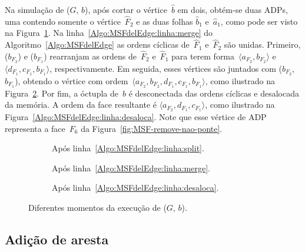 Na simulação de \MSFdelEdge($G$, $b$), após cortar o vértice~$\hat b$ em dois, obtém-se duas ADPs, uma contendo somente o vértice~$\hat F_2$ e as duas folhas $\hat b_1$ e~$\hat a_1$, como pode ser visto na Figura~\ref{fig:MSF-remove-aresta-ex-1}.
Na linha~\ref{Algo:MSFdelEdge:linha:merge} do Algoritmo~\ref{Algo:MSFdelEdge} as ordens cíclicas de~$\hat F_1$ e~$\hat F_2$ são unidas.
Primeiro, \LCOCycle($b_{F_2}$) e \LCOCycle($b_{F_1}$) rearranjam as ordens de~$\hat F_2$ e~$\hat F_1$ para terem forma~$\langle  a_{F_2}, b_{F_2} \rangle$ e~$\langle d_{F_1}, c_{F_1}, b_{F_1}\rangle$, respectivamente.
Em seguida, esses vértices são juntados com \LCOMerge($b_{F_2}$, $b_{F_1}$), obtendo o vértice com ordem~$\langle a_{F_2}, b_{F_2}, d_{F_1}, c_{F_1}, b_{F_1}\rangle$, como ilustrado na Figura~\ref{fig:MSF-remove-aresta-ex-2}.
Por fim, a óctupla de~$b$ é desconectada das ordens cíclicas e desalocada da memória.
A ordem da face resultante é $\langle a_{F_2}, d_{F_1}, c_{F_1}\rangle$, como ilustrado na Figura~\ref{Algo:MSFdelEdge:linha:desaloca}.
Note que esse vértice de ADP representa a face~$F_6$ da Figura~\ref{fig:MSF-remove-nao-ponte}. 

\begin{figure}[h!]
\begin{subfigure}{.2\textwidth}

\caption{Após linha~\ref{Algo:MSFdelEdge:linha:split}.}
\label{fig:MSF-remove-aresta-ex-1}
\end{subfigure}
\hfill
\begin{subfigure}{.2\textwidth}

\caption{Após linha~\ref{Algo:MSFdelEdge:linha:merge}.}
\label{fig:MSF-remove-aresta-ex-2}
\end{subfigure}
\hfill
\begin{subfigure}{.2\textwidth}

\caption{Após linha~\ref{Algo:MSFdelEdge:linha:desaloca}.}
\label{fig:MSF-remove-aresta-ex-3}
\end{subfigure}
\caption{Diferentes momentos da execução de \MSFdelEdge($G$, $b$).}
\label{fig:MSF-remocao-b}
\end{figure}


\subsection{Adição de aresta}

